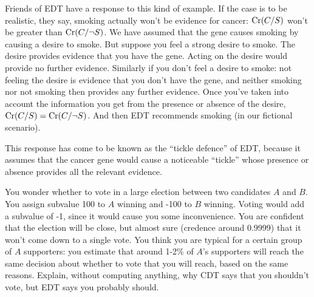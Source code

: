Friends of EDT have a response to this kind of example. If the case is to be
realistic, they say, smoking actually won't be evidence for cancer: $\text{Cr}(C/S)$
won't be greater than $\text{Cr}(C/\neg S)$. We have assumed that the gene causes
smoking by causing a desire to smoke. But suppose you feel a strong desire to
smoke. The desire provides evidence that you have the gene. Acting on the desire
would provide no further evidence. Similarly if you don't feel a desire to
smoke: not feeling the desire is evidence that you don't have the gene, and
neither smoking nor not smoking then provides any further evidence. Once you've
taken into account the information you get from the presence or absence of the
desire, $\text{Cr}(C/S)=\text{Cr}(C/\neg S)$. And then EDT recommends smoking (in our
fictional scenario).

This response has come to be known as the ``tickle defence'' of EDT, because it
assumes that the cancer gene would cause a noticeable ``tickle'' whose presence
or absence provides all the relevant evidence.

\begin{exercise}{1}
  You wonder whether to vote in a large election between two candidates $A$ and
  $B$. You assign subvalue 100 to $A$ winning and -100 to $B$ winning. Voting
  would add a subvalue of -1, since it would cause you some inconvenience. You
  are confident that the election will be close, but almost sure (credence
  around 0.9999) that it won't come down to a single vote. You think you are
  typical for a certain group of $A$ supporters: you estimate that around 1-2\%
  of $A$'s supporters will reach the same decision about whether to vote that
  you will reach, based on the same reasons. Explain, without computing
  anything, why CDT says that you shouldn't vote, but EDT says you probably
  should.
\end{exercise}




